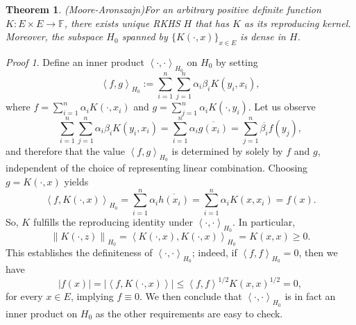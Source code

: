 \documentclass[a4paper,12pt]{article}
\newtheorem{thm}{Theorem}[section]
\theoremstyle{remark}
\newtheorem*{prf}{Proof}
\theoremstyle{definition}
\newtheorem{rem}[thm]{Remark}
\theoremstyle{definition}
\theoremstyle{definition}
\newcommand{\ip}[2]{\left<#1, #2 \right>}
\newcommand{\abs}[1]{\left| #1 \right|}
\newcommand{\norm}[1]{\left\| #1 \right\|}
\newcommand{\fin}{\hfill \( \triangleleft \) }
\begin{document}

\begin{thm} (Moore-Aronszajn)\label{Moore Theorem}
	For an arbitrary positive definite function \( K:E \times E \to \mathbb{F} \), there exists unique RKHS \( H \) that has \( K \) as its reproducing kernel. Moreover, the subspace \( H_0 \) spanned by \( \{K(\cdot ,x)\}_{x \in E} \) is dense in \( H \).
\end{thm}
\begin{prf}
	Define an inner product \( \ip{\cdot}{\cdot }_{H_0} \) on \( H_0 \) by setting
	\begin{equation*}
		\ip{f}{g}_{H_0} := \sum_{i=1}^{n} \sum_{j=1}^{n} \alpha_i \beta_i K(y_i,x_i),
	\end{equation*}
	where \( f= \sum_{i=1}^{n} \alpha_i K(\cdot ,x_i) \) and \( g= \sum_{j=1}^{n} \alpha_i K(\cdot ,y_i) \). Let us observe
	\begin{equation*}
		\sum_{i=1}^{n} \sum_{j=1}^{n} \alpha_i \beta_i K(y_i,x_i)
		= \sum_{i=1}^{n}\alpha_i \overline{g(x_i)} = \sum_{j=1}^{n} \overline{\beta_i}f(y_j),
	\end{equation*}
	and therefore that the value \( \ip{f}{g}_{H_0} \) is determined by solely by \( f \) and \( g \), independent of the choice of representing linear combination. Choosing \( g=K(\cdot ,x) \) yields
	\begin{equation*}
		\ip{f}{K(\cdot ,x)}_{H_0} = \sum_{i=1}^{n} \alpha_i \overline{h(x_i)}
		= \sum_{i=1}^{n} \alpha_i K(x,x_i) = f(x).
	\end{equation*}
	So, \( K \) fulfills the reproducing identity under \( \ip{\cdot }{\cdot }_{H_0} \). In particular,
	\begin{equation*}
		\norm{K(\cdot ,z)}_{H_0} = \ip{K(\cdot ,x)}{K(\cdot ,x)}_{H_0} = K(x,x) \ge 0.
	\end{equation*}
	This establishes the definiteness of \( \ip{\cdot }{\cdot }_{H_0} \); indeed, if \( \ip{f}{f}_{H_0} = 0 \), then we have
	\begin{equation*}
		\abs{f(x)} = \abs{\ip{f}{K(\cdot ,x)}} \le \ip{f}{f}^{1/2}K(x,x)^{1/2}=0,
	\end{equation*}
	for every \( x \in E \), implying \( f \equiv 0 \). We then conclude that \( \ip{\cdot }{\cdot }_{H_0} \) is in fact an inner product on \( H_0 \) as the other requirements are easy to check.


\end{prf}
\end{document}
